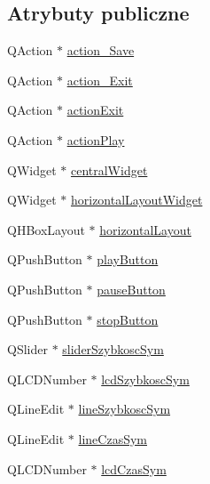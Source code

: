 \subsection*{Atrybuty publiczne}
\begin{DoxyCompactItemize}
\item 
Q\+Action $\ast$ \hyperlink{class_ui___d_main_window_a7ab98279e07bdd724a091ea06012c87b}{action\+\_\+\+Save}
\item 
Q\+Action $\ast$ \hyperlink{class_ui___d_main_window_a00e6b795743b676bdf3ed853e91f7029}{action\+\_\+\+Exit}
\item 
Q\+Action $\ast$ \hyperlink{class_ui___d_main_window_ae1fa62a4d27fa0f4a5c63c7c60cfdad2}{action\+Exit}
\item 
Q\+Action $\ast$ \hyperlink{class_ui___d_main_window_a6cfb6311ca1dd6e247d80255e2667ba7}{action\+Play}
\item 
Q\+Widget $\ast$ \hyperlink{class_ui___d_main_window_a94cf40cb4e645cfa2e80f36ffbf5018e}{central\+Widget}
\item 
Q\+Widget $\ast$ \hyperlink{class_ui___d_main_window_a777a56f3b74aa5b5cd5ff2c62a2968a9}{horizontal\+Layout\+Widget}
\item 
Q\+H\+Box\+Layout $\ast$ \hyperlink{class_ui___d_main_window_a4ab6ff85d8c5edef531b3f2111a04157}{horizontal\+Layout}
\item 
Q\+Push\+Button $\ast$ \hyperlink{class_ui___d_main_window_ad87cbf39ac14374923ed2a2b11e8b1bf}{play\+Button}
\item 
Q\+Push\+Button $\ast$ \hyperlink{class_ui___d_main_window_a70e142e35db4995a1fefa082406bdef3}{pause\+Button}
\item 
Q\+Push\+Button $\ast$ \hyperlink{class_ui___d_main_window_a1fe7797fff349a0f0d47d90c8438f386}{stop\+Button}
\item 
Q\+Slider $\ast$ \hyperlink{class_ui___d_main_window_a8d12f07935a52a597e57eddf50e5c98f}{slider\+Szybkosc\+Sym}
\item 
Q\+L\+C\+D\+Number $\ast$ \hyperlink{class_ui___d_main_window_a4eb8e2a87080f4f314eb96c52a82e39d}{lcd\+Szybkosc\+Sym}
\item 
Q\+Line\+Edit $\ast$ \hyperlink{class_ui___d_main_window_a73bafa5343a8e3cb7cd673a24be76008}{line\+Szybkosc\+Sym}
\item 
Q\+Line\+Edit $\ast$ \hyperlink{class_ui___d_main_window_aad165daf4686baecb2ccd6709c629579}{line\+Czas\+Sym}
\item 
Q\+L\+C\+D\+Number $\ast$ \hyperlink{class_ui___d_main_window_af49335a21dc17e53674f8b62a640ca2d}{lcd\+Czas\+Sym}

\end{DoxyCompactItemize}
